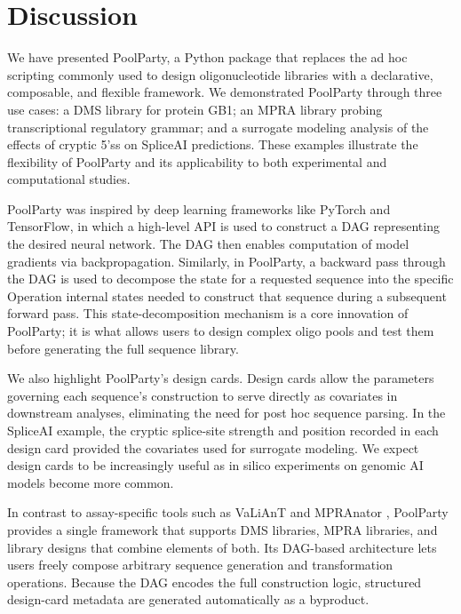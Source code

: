 \documentclass[pdflatex,sn-vancouver-num,referee,oneside]{sn-jnl}
\begin{document}
\section{Discussion}\label{sec:discussion}

We have presented PoolParty, a Python package that replaces the ad hoc scripting commonly used to design oligonucleotide libraries with a declarative, composable, and flexible framework. We demonstrated PoolParty through three use cases: a DMS library for protein GB1; an MPRA library probing transcriptional regulatory grammar; and a surrogate modeling analysis of the effects of cryptic 5'ss on SpliceAI predictions. These examples illustrate the flexibility of PoolParty and its applicability to both experimental and computational studies.

PoolParty was inspired by deep learning frameworks like PyTorch and TensorFlow, in which a high-level API is used to construct a DAG representing the desired neural network. The DAG then enables computation of model gradients via backpropagation. Similarly, in PoolParty, a backward pass through the DAG is used to decompose the state for a requested sequence into the specific Operation internal states needed to construct that sequence during a subsequent forward pass. This state-decomposition mechanism is a core innovation of PoolParty; it is what allows users to design complex oligo pools and test them before generating the full sequence library.

We also highlight PoolParty's design cards. Design cards allow the parameters governing each sequence's construction to serve directly as covariates in downstream analyses, eliminating the need for post hoc sequence parsing. In the SpliceAI example, the cryptic splice-site strength and position recorded in each design card provided the covariates used for surrogate modeling. We expect design cards to be increasingly useful as in silico experiments on genomic AI models become more common.

In contrast to assay-specific tools such as VaLiAnT \citep{Barbon2022th} and MPRAnator \citep{GeorgakopoulosSoares2017gb}, PoolParty provides a single framework that supports DMS libraries, MPRA libraries, and library designs that combine elements of both. Its DAG-based architecture lets users freely compose arbitrary sequence generation and transformation operations. Because the DAG encodes the full construction logic, structured design-card metadata are generated automatically as a byproduct.
\end{document}
